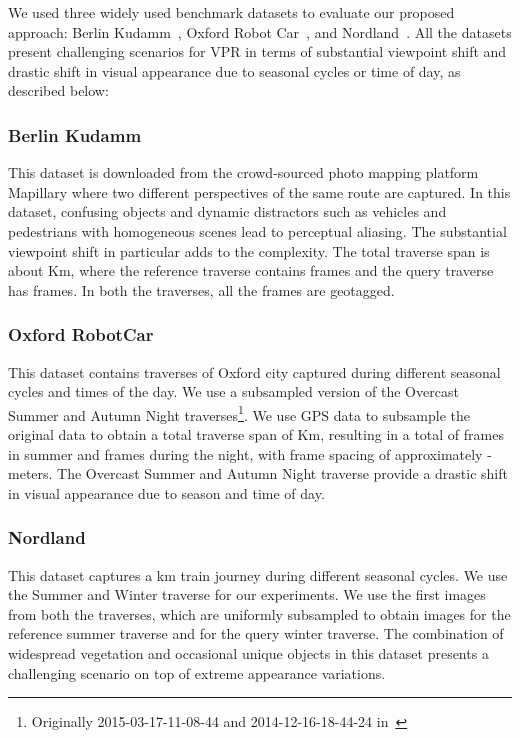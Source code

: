 \documentclass[letterpaper, 10 pt, conference]{ieeeconf}  \fi
\begin{document}
We used three widely used benchmark datasets to evaluate our proposed approach: Berlin Kudamm~\cite{8202131,sunderhauf2015place}, Oxford Robot Car~\cite{maddern20171}, and Nordland~\cite{olid2018single}. All the datasets present challenging scenarios for VPR in terms of substantial viewpoint shift and drastic shift in visual appearance due to seasonal cycles or time of day, as described below:

\subsubsection{Berlin Kudamm} This dataset is downloaded from the crowd-sourced photo mapping platform Mapillary where two different perspectives of the same route are captured. In this dataset, confusing objects and dynamic distractors such as vehicles and pedestrians with homogeneous scenes lead to perceptual aliasing. The substantial viewpoint shift in particular adds to the complexity. The total traverse span is about  Km, where the reference traverse contains  frames and the query traverse has  frames. In both the traverses, all the frames are geotagged.

\subsubsection{Oxford RobotCar} This dataset contains traverses of Oxford city captured during different seasonal cycles and times of the day. We use a subsampled version of the Overcast Summer and Autumn Night traverses\footnote{Originally 2015-03-17-11-08-44 and 2014-12-16-18-44-24 in~\cite{maddern20171}}. We use GPS data to subsample the original data to obtain a total traverse span of  Km, resulting in a total of  frames in summer and  frames during the night, with frame spacing of approximately - meters. The Overcast Summer and Autumn Night traverse provide a drastic shift in visual appearance due to season and time of day.

\subsubsection{Nordland} This dataset captures a  km train journey during different seasonal cycles. We use the Summer and Winter traverse for our experiments. We use the first  images from both the traverses, which are uniformly subsampled to obtain  images for the reference summer traverse and  for the query winter traverse. The combination of widespread vegetation and occasional unique objects in this dataset presents a challenging scenario on top of extreme appearance variations.
\end{document}
